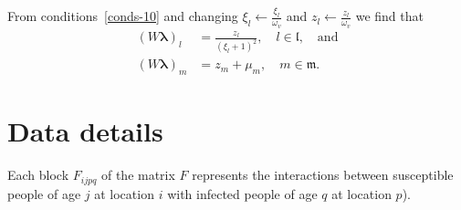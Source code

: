 \documentclass[12pt]{amsart}
\theoremstyle{definition}
\begin{document}

From conditions~\eqref{conds-10} and changing $\xi_l\leftarrow\frac{\xi_l}{\omega_v}$ and 
$z_l\leftarrow\frac{z_l}{\omega_v}$ we find that
\begin{equation}
    \begin{aligned}
       ( W\bm\lambda)_l &= \frac{z_l}{(\xi_l+1)^2},\quad l\in \mathfrak{l},\quad\mbox{and}\\ 
       ( W\bm\lambda)_m &= z_m+\mu_m, \quad m\in \mathfrak{m}.
    \end{aligned}
\end{equation}





\section{Data details}
Each block $F_{ijpq}$ of the matrix $F$ represents the interactions between susceptible people of age $j$ at location $i$ with infected people of age $q$ at location $p$).
\end{document}
